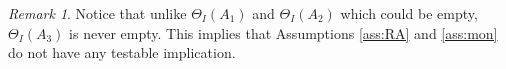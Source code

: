\documentclass[12pt]{article}
\theoremstyle{plain}
\theoremstyle{definition}
\theoremstyle{remark}
\newtheorem{remark}{Remark}%
\begin{document}


\begin{remark}
Notice that unlike $\Theta_I(A_1)$ and $\Theta_I(A_2)$ which could be empty, $\Theta_I(A_3)$ is never empty. This implies that Assumptions \ref{ass:RA} and \ref{ass:mon} do not have any testable implication. 
\end{remark}
\end{document}
